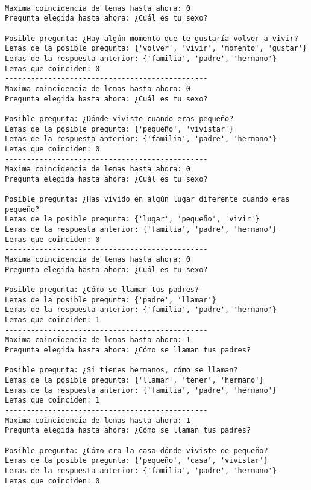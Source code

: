 \begin{verbatim}

Maxima coincidencia de lemas hasta ahora: 0
Pregunta elegida hasta ahora: ¿Cuál es tu sexo?

Posible pregunta: ¿Hay algún momento que te gustaría volver a vivir?
Lemas de la posible pregunta: {'volver', 'vivir', 'momento', 'gustar'}
Lemas de la respuesta anterior: {'familia', 'padre', 'hermano'}
Lemas que coinciden: 0
-----------------------------------------------
Maxima coincidencia de lemas hasta ahora: 0
Pregunta elegida hasta ahora: ¿Cuál es tu sexo?

Posible pregunta: ¿Dónde viviste cuando eras pequeño?
Lemas de la posible pregunta: {'pequeño', 'vivistar'}
Lemas de la respuesta anterior: {'familia', 'padre', 'hermano'}
Lemas que coinciden: 0
-----------------------------------------------
Maxima coincidencia de lemas hasta ahora: 0
Pregunta elegida hasta ahora: ¿Cuál es tu sexo?

Posible pregunta: ¿Has vivido en algún lugar diferente cuando eras pequeño?
Lemas de la posible pregunta: {'lugar', 'pequeño', 'vivir'}
Lemas de la respuesta anterior: {'familia', 'padre', 'hermano'}
Lemas que coinciden: 0
-----------------------------------------------
Maxima coincidencia de lemas hasta ahora: 0
Pregunta elegida hasta ahora: ¿Cuál es tu sexo?

Posible pregunta: ¿Cómo se llaman tus padres?
Lemas de la posible pregunta: {'padre', 'llamar'}
Lemas de la respuesta anterior: {'familia', 'padre', 'hermano'}
Lemas que coinciden: 1
-----------------------------------------------
Maxima coincidencia de lemas hasta ahora: 1
Pregunta elegida hasta ahora: ¿Cómo se llaman tus padres?

Posible pregunta: ¿Si tienes hermanos, cómo se llaman?
Lemas de la posible pregunta: {'llamar', 'tener', 'hermano'}
Lemas de la respuesta anterior: {'familia', 'padre', 'hermano'}
Lemas que coinciden: 1
-----------------------------------------------
Maxima coincidencia de lemas hasta ahora: 1
Pregunta elegida hasta ahora: ¿Cómo se llaman tus padres?

Posible pregunta: ¿Cómo era la casa dónde viviste de pequeño?
Lemas de la posible pregunta: {'pequeño', 'casa', 'vivistar'}
Lemas de la respuesta anterior: {'familia', 'padre', 'hermano'}
Lemas que coinciden: 0
\end{verbatim}


